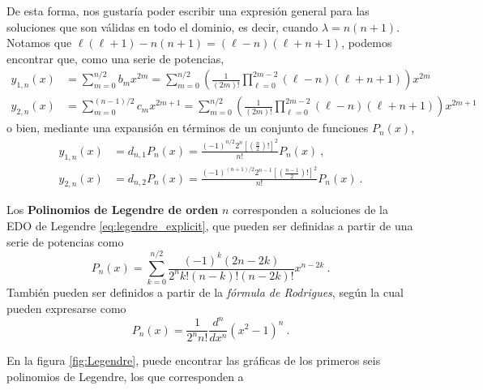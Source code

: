 De esta forma, nos gustaría poder escribir una expresión general para las soluciones que son válidas en todo el dominio, es decir, cuando $\lambda = n(n+1)$. Notamos que $\ell(\ell+1)-n(n+1) = (\ell - n)(\ell + n + 1)$, podemos encontrar que, como una serie de potencias,
\begin{align} 
    y_{1,n}(x) & = \sum_{m=0}^{n/2} b_m x^{2m} = \sum_{m=0}^{n/2} \left(\frac{1}{(2m)!} \prod_{\ell=0}^{2m-2} (\ell-n)(\ell+n+1) \right) x^{2m} \\
    y_{2,n}(x) & = \sum_{m=0}^{(n-1)/2} c_m x^{2m+1} = \sum_{m=0}^{n/2} \left(\frac{1}{(2m)!} \prod_{\ell=0}^{2m-2} (\ell-n)(\ell+n+1) \right) x^{2m+1}
\end{align}
o bien, mediante una expansión en términos de un conjunto de funciones $P_n(x)$,
\begin{align}
   y_{1,n}(x) & = d_{n,1} P_n(x) = \frac{(-1)^{n/2} 2^n \left[ \left(\frac{n}{2}\right)! \right]^2}{n!}P_n(x) \ , \label{eq:y1n_legendre}  \\
   y_{2,n}(x) & = d_{n,2} P_n(x) = \frac{(-1)^{(n+1)/2} 2^{n-1} \left[ \left(\frac{n-1}{2}\right)! \right]^2}{n!}P_n(x) \ . \label{eq:y2n_legendre}
\end{align}


\begin{defi}
    Los \textbf{Polinomios de Legendre de orden} $n$ corresponden a soluciones de la EDO de Legendre \eqref{eq:legendre_explicit}, que pueden ser definidas a partir de una serie de potencias como
    \begin{equation}
        P_n(x) = \sum_{k=0}^{n/2} \frac{(-1)^k (2n-2k)}{2^n k! (n-k)! (n-2k)!}x^{n-2k} \ .
    \end{equation}
    También pueden ser definidos a partir de la \emph{fórmula de Rodrigues}, según la cual pueden expresarse como
    \begin{equation}
        P_n(x) = \frac{1}{2^n n!} \frac{d^n}{dx^n} (x^2-1)^n \ .
    \end{equation}
\end{defi}


En la figura \ref{fig:Legendre}, puede encontrar las gráficas de los primeros seis polinomios de Legendre, los que corresponden a

